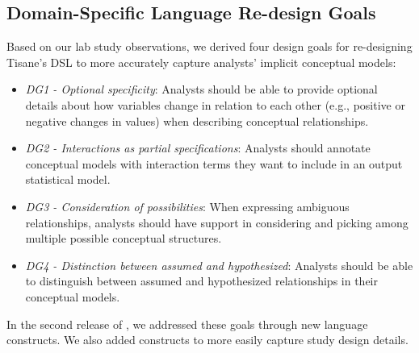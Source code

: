 \subsection{Domain-Specific Language Re-design Goals} \label{sec:rtisane_design_implications} 
Based on our lab study observations, we derived four design goals for
re-designing Tisane's DSL to more accurately capture analysts' implicit
conceptual models: 

\def\optionalSpecificity{\textit{DG1 - Optional specificity}\xspace}
\def\interactionAsPartialSpec{\textit{DG2 - Interactions as partial specifications}\xspace}
\def\considerPossibilities{\textit{DG3 - Consideration of possibilities}\xspace}
\def\assumeHypothesize{\textit{DG4 - Distinction between assumed and hypothesized}\xspace}
\begin{itemize}
    \item \optionalSpecificity: Analysts should be able to provide optional
    details about how variables change in relation to each other (e.g., positive
    or negative changes in values) when describing conceptual relationships.
    \item \interactionAsPartialSpec: Analysts should annotate conceptual models with interaction terms they want to include in an output statistical model. 
    \item \considerPossibilities: When expressing ambiguous relationships, analysts should have support
    in considering and picking among multiple possible conceptual structures.
    \item \assumeHypothesize: Analysts should be able to distinguish between assumed and hypothesized relationships in their conceptual models. 
\end{itemize}

In the second release of \tisane, we addressed these goals through new language
constructs. We also added constructs to more easily capture
study design details. 


